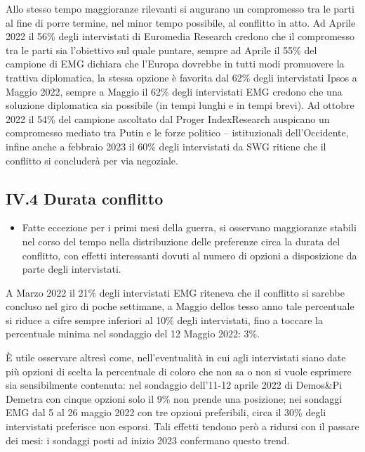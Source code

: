 \documentclass[
  openany]{book}
\providecommand{\tightlist}{%
  \setlength{\itemsep}{0pt}\setlength{\parskip}{0pt}}
\begin{document}
Allo stesso tempo maggioranze rilevanti si augurano un compromesso tra le parti al fine di porre termine, nel minor tempo possibile, al conflitto in atto. Ad Aprile 2022 il 56\% degli intervistati di Euromedia Research credono che il compromesso tra le parti sia l'obiettivo sul quale puntare, sempre ad Aprile il 55\% del campione di EMG dichiara che l'Europa dovrebbe in tutti modi promuovere la trattiva diplomatica, la stessa opzione è favorita dal 62\% degli intervistati Ipsos a Maggio 2022, sempre a Maggio il 62\% degli intervistati EMG credono che una soluzione diplomatica sia possibile (in tempi lunghi e in tempi brevi). Ad ottobre 2022 il 54\% del campione ascoltato dal Proger IndexResearch auspicano un compromesso mediato tra Putin e le forze politico -- istituzionali dell'Occidente, infine anche a febbraio 2023 il 60\% degli intervistati da SWG ritiene che il conflitto si concluderà per via negoziale.

\hypertarget{iv.4-durata-conflitto}{%
\subsection{IV.4 Durata conflitto}\label{iv.4-durata-conflitto}}

\begin{itemize}
\tightlist
\item
  Fatte eccezione per i primi mesi della guerra, si osservano maggioranze stabili nel corso del tempo nella distribuzione delle preferenze circa la durata del conflitto, con effetti interessanti dovuti al numero di opzioni a disposizione da parte degli intervistati.
\end{itemize}

A Marzo 2022 il 21\% degli intervistati EMG riteneva che il conflitto si sarebbe concluso nel giro di poche settimane, a Maggio dellos tesso anno tale percentuale si riduce a cifre sempre inferiori al 10\% degli intervistati, fino a toccare la percentuale minima nel sondaggio del 12 Maggio 2022: 3\%.

È utile osservare altresì come, nell'eventualità in cui agli intervistati siano date più opzioni di scelta la percentuale di coloro che non sa o non si vuole esprimere sia sensibilmente contenuta: nel sondaggio dell'11-12 aprile 2022 di Demos\&Pi Demetra con cinque opzioni solo il 9\% non prende una posizione; nei sondaggi EMG dal 5 al 26 maggio 2022 con tre opzioni preferibili, circa il 30\% degli intervistati preferisce non esporsi. Tali effetti tendono però a ridursi con il passare dei mesi: i sondaggi posti ad inizio 2023 confermano questo trend.
\end{document}
